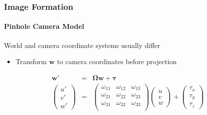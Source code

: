 \documentclass[xetex,professionalfont]{beamer}
\renewcommand{\vec}[1]{\ensuremath{\mathbf{#1}}}
\newcommand{\vw}{\vec{w}}
\begin{document}

\begin{frame}
\frametitle{Image Formation}
\framesubtitle{Pinhole Camera Model}

World and camera coordinate systems usually differ
\begin{itemize}
    \item Transform $\vw$ to camera coordinates before projection
\end{itemize}
\begin{eqnarray*}
    \vw' &=& \boldsymbol{\Omega}\vw + \boldsymbol{\tau} \\
    \begin{pmatrix}
        u' \\ v' \\ w'
    \end{pmatrix} &=&
    \begin{pmatrix}
        \omega_{11} & \omega_{12} & \omega_{13} \\
        \omega_{21} & \omega_{22} & \omega_{23} \\
        \omega_{31} & \omega_{32} & \omega_{33} \\
    \end{pmatrix}
    \begin{pmatrix}
        u \\ v \\ w
    \end{pmatrix} +
    \begin{pmatrix}
        \tau_x \\ \tau_y \\ \tau_z
    \end{pmatrix}
\end{eqnarray*}

\end{frame}

\end{document}
